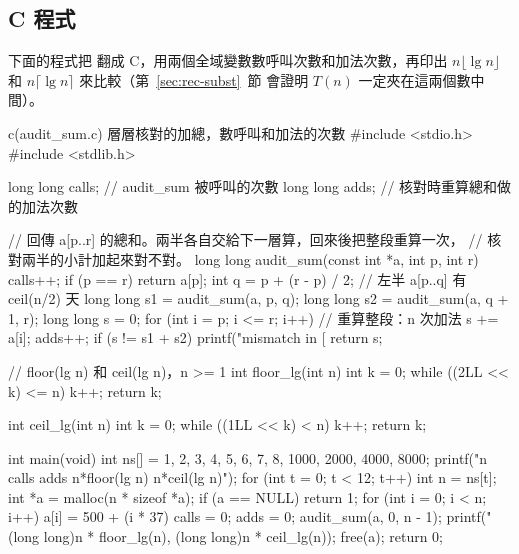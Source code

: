 \subsection{C 程式}

下面的程式把  翻成 C，用兩個全域變數數呼叫次數和加法次數，再印出
$n \lfloor \lg n \rfloor$ 和 $n \lceil \lg n \rceil$ 來比較（第~\ref{sec:rec-subst}~節
會證明 $T(n)$ 一定夾在這兩個數中間）。

\begin{example}[label=ex:rec-audit]{c}{(audit\_sum.c) 層層核對的加總，數呼叫和加法的次數}
#include <stdio.h>
#include <stdlib.h>

long long calls;    // audit_sum 被呼叫的次數
long long adds;     // 核對時重算總和做的加法次數

// 回傳 a[p..r] 的總和。兩半各自交給下一層算，回來後把整段重算一次，
// 核對兩半的小計加起來對不對。
long long audit_sum(const int *a, int p, int r)
{
    calls++;
    if (p == r) {
        return a[p];
    }
    int q = p + (r - p) / 2;        // 左半 a[p..q] 有 ceil(n/2) 天
    long long s1 = audit_sum(a, p, q);
    long long s2 = audit_sum(a, q + 1, r);
    long long s = 0;
    for (int i = p; i <= r; i++) {  // 重算整段：n 次加法
        s += a[i];
        adds++;
    }
    if (s != s1 + s2) {
        printf("mismatch in [%
    }
    return s;
}

// floor(lg n) 和 ceil(lg n)，n >= 1
int floor_lg(int n)
{
    int k = 0;
    while ((2LL << k) <= n) {
        k++;
    }
    return k;
}

int ceil_lg(int n)
{
    int k = 0;
    while ((1LL << k) < n) {
        k++;
    }
    return k;
}

int main(void)
{
    int ns[] = {1, 2, 3, 4, 5, 6, 7, 8, 1000, 2000, 4000, 8000};
    printf("n calls adds n*floor(lg n) n*ceil(lg n)\n");
    for (int t = 0; t < 12; t++) {
        int n = ns[t];
        int *a = malloc(n * sizeof *a);
        if (a == NULL) {
            return 1;
        }
        for (int i = 0; i < n; i++) {
            a[i] = 500 + (i * 37) %
        }
        calls = 0;
        adds = 0;
        audit_sum(a, 0, n - 1);
        printf("%
               (long long)n * floor_lg(n), (long long)n * ceil_lg(n));
        free(a);
    }
    return 0;
}
\end{example}

